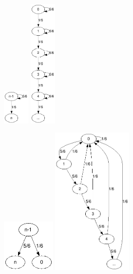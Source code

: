 \documentclass[12pt]{article}					%
\begin{document}
\begin{priklad}
	\begin{reseni}
		\includegraphics[width=0.1\textwidth]{chart2.png}
		\includegraphics[width=0.1\textwidth]{chart2B.png}
	\end{reseni}

	\begin{reseni}
		\includegraphics[width=0.2\textwidth]{chart3.png}
		\includegraphics[width=0.3\textwidth]{chart3B.png}
	\end{reseni}


\end{priklad}
\end{document}
